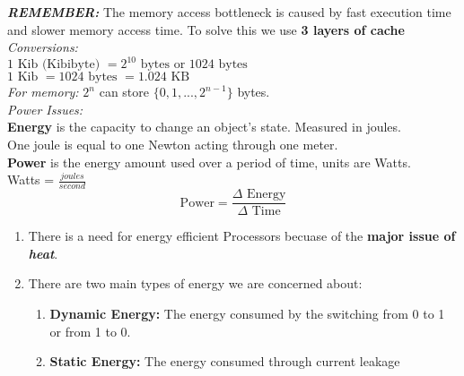 \documentclass{book}
\begin{document}
	\noindent \emph{\textbf{REMEMBER:}} The memory access bottleneck is caused by fast execution time and slower memory access time. To solve this we use \textbf{3 layers of cache}\\

	\noindent \emph{Conversions: } \\
	$ 1 \text{ Kib} \text{ (Kibibyte) } = 2^{10} \text{ bytes or } 1024 \text{ bytes}$ \\
	$ 1 \text{ Kib } = 1024 \text{ bytes } = 1.024 \text{ KB} $ \\
	\emph{For memory: } $2^n$ can store $\{0, 1, ..., 2^{n - 1}\}$ bytes. \\

	\noindent \emph{Power Issues: }\\
	\noindent \textbf{Energy} is the capacity to change an object's state. Measured in joules.\\
	\indent One joule is equal to one Newton acting through one meter.\\
	\noindent \textbf{Power} is the energy amount used over a period of time, units are Watts.\\
		\indent Watts = $\frac{joules}{second}$
		$$ \text{Power} = \frac{\text{$\Delta$ Energy}}{\text{$\Delta$ Time}} $$
	\begin{enumerate}
		\item There is a need for energy efficient Processors becuase of the \textbf{major issue of \emph{heat}}.
		\item There are two main types of energy we are concerned about:
		\begin{enumerate}
			\item \textbf{Dynamic Energy:} The energy consumed by the switching from 0 to 1 or from 1 to 0.
			\item \textbf{Static Energy:} The energy consumed through current leakage
		\end{enumerate}
	\end{enumerate}
\end{document}
